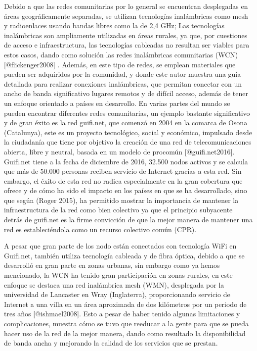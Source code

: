 \documentclass[]{article}
\begin{document}
Debido a que las redes comunitarias por lo general se encuentran
desplegadas en áreas geográficamente separadas, se utilizan tecnologías
inalámbricas como mesh y radioenlaces usando bandas libres como la de
2,4 GHz; Las tecnologías inalámbricas son ampliamente utilizadas en
áreas rurales, ya que, por cuestiones de acceso e infraestructura, las
tecnologías cableadas no resultan ser viables para estos casos, dando
como solución las redes inalámbricas comunitarias (WCN)
{[}@flickenger2008{]} . Además, en este tipo de redes, se emplean
materiales que pueden ser adquiridos por la comunidad, y donde este
autor muestra una guía detallada para realizar conexiones inalámbricas,
que permitan conectar con un ancho de banda significativo lugares
remotos y de difícil acceso, además de tener un enfoque orientado a
países en desarrollo. En varias partes del mundo se pueden encontrar
diferentes redes comunitarias, un ejemplo bastante significativo y de
gran éxito es la red guifi.net, que comenzó en 2004 en la comarca de
Osona (Catalunya), este es un proyecto tecnológico, social y económico,
impulsado desde la ciudadanía que tiene por objetivo la creación de una
red de telecomunicaciones abierta, libre y neutral, basada en un modelo
de procomún {[}@guifi.net2016{]}. Guifi.net tiene a la fecha de
diciembre de 2016, 32.500 nodos activos y se calcula que más de 50.000
personas reciben servicio de Internet gracias a esta red. Sin embargo,
el éxito de esta red no radica especialmente en la gran cobertura que
ofrece y de cómo ha sido el impacto en los países en que se ha
desarrollado, sino que según (Roger 2015), ha permitido mostrar la
importancia de mantener la infraestructura de la red como bien colectivo
ya que el principio subyacente detrás de guifi.net es la firme
convicción de que la mejor manera de mantener una red es estableciéndola
como un recurso colectivo común (CPR).

A pesar que gran parte de los nodo están conectados con tecnología WiFi
en Guifi.net, también utiliza tecnología cableada y de fibra óptica,
debido a que se desarrolló en gran parte en zonas urbanas, sin embargo
como ya hemos mencionado, la WCN ha tenido gran participación en zonas
rurales, en este enfoque se destaca una red inalámbrica mesh (WMN),
desplegada por la universidad de Lancaster en Wray (Inglaterra),
proporcionando servicio de Internet a una villa en un área aproximada de
dos kilómetros por un periodo de tres años {[}@ishmael2008{]}. Esto a
pesar de haber tenido algunas limitaciones y complicaciones, muestra
cómo se tuvo que reeducar a la gente para que se pueda hacer uso de la
red de la mejor manera, dando como resultado la disponibilidad de banda
ancha y mejorando la calidad de los servicios que se prestan.
\end{document}
